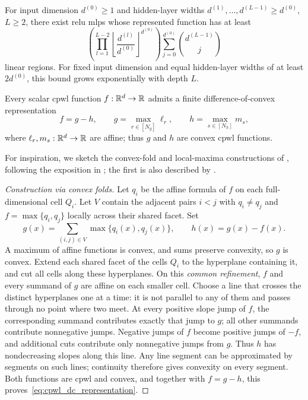 \begin{theoremenv}\label{thm:linear_region_count}
For input dimension $d^{(0)}\ge1$ and hidden-layer widths $d^{(1)},\ldots,d^{(L-1)}\ge d^{(0)}$, $L\ge2$, there exist \ac{relu} \acp{mlp} whose represented function has at least
\[
\left(\prod_{l=1}^{L-2}\left\lfloor\frac{d^{(l)}}{d^{(0)}}\right\rfloor^{d^{(0)}}\right)
\sum_{j=0}^{d^{(0)}}\binom{d^{(L-1)}}{j}
\]
linear regions. For fixed input dimension and equal hidden-layer widths of at least $2d^{(0)}$, this bound grows exponentially with depth $L$.
\end{theoremenv}

\begin{theoremenv}\label{thm:cpwl_dc_representation}
Every scalar \ac{cpwl} function $f:\mathbb{R}^d\to\mathbb{R}$ admits a finite difference-of-convex representation
\begin{equation}
 f=g-h,\qquad g=\max_{r\in[N_g]}\ell_r,\qquad h=\max_{s\in[N_h]}m_s,
 \label{eq:cpwl_dc_representation}
\end{equation}
where $\ell_r,m_s:\mathbb{R}^d\to\mathbb{R}$ are affine; thus $g$ and $h$ are convex \ac{cpwl} functions.
\end{theoremenv}

For inspiration, we sketch the convex-fold and local-maxima constructions of \textcite{Kripfganz1987_PWAasDC}, following the exposition in \textcite[Appendix~B]{Brandenburg2025_DecompositionPolyhedra}; the first is also described by \textcite[Section~2.1]{Schlueter2021_ConvexDecompPAF}.

\begin{proof}[Construction via convex folds]
Let $q_i$ be the affine formula of $f$ on each full-dimensional cell $Q_i$. Let $V$ contain the adjacent pairs $i<j$ with $q_i\ne q_j$ and $f=\max\{q_i,q_j\}$ locally across their shared facet. Set
\[
g(x)=\sum_{(i,j)\in V}\max\{q_i(x),q_j(x)\},\qquad h(x)=g(x)-f(x).
\]
A maximum of affine functions is convex, and sums preserve convexity, so $g$ is convex. Extend each shared facet of the cells $Q_i$ to the hyperplane containing it, and cut all cells along these hyperplanes. On this \emph{common refinement}, $f$ and every summand of $g$ are affine on each smaller cell. Choose a line that crosses the distinct hyperplanes one at a time: it is not parallel to any of them and passes through no point where two meet. At every positive slope jump of $f$, the corresponding summand contributes exactly that jump to $g$; all other summands contribute nonnegative jumps. Negative jumps of $f$ become positive jumps of $-f$, and additional cuts contribute only nonnegative jumps from $g$. Thus $h$ has nondecreasing slopes along this line. Any line segment can be approximated by segments on such lines; continuity therefore gives convexity on every segment. Both functions are \ac{cpwl} and convex, and together with $f=g-h$, this proves~\eqref{eq:cpwl_dc_representation}.
\end{proof}

